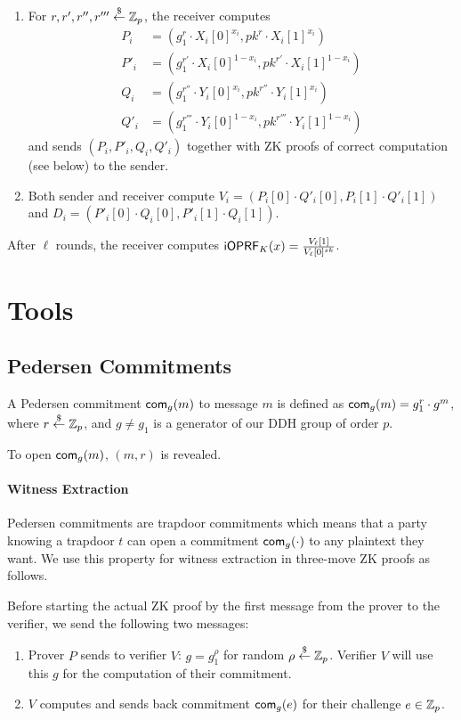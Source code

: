 \documentclass{article}
\begin{document}
\begin{enumerate}
\item
  For $r,r',r'',r'''\stackrel{\$}{\leftarrow}\mathbb{Z}_p$, the receiver computes
  \begin{align*}
    P_i&=(g_1^r\cdot{}X_i[0]^{x_i},pk^r\cdot{}X_i[1]^{x_i})
    \\P'_i&=(g_1^{r'}\cdot{}X_i[0]^{1-x_i},pk^{r'}\cdot{}X_i[1]^{1-x_i})
   \\Q_i&=(g_1^{r''}\cdot{}Y_i[0]^{x_i},pk^{r''}\cdot{}Y_i[1]^{x_i})
   \\Q'_i&=(g_1^{r'''}\cdot{}Y_i[0]^{1-x_i},pk^{r'''}\cdot{}Y_i[1]^{1-x_i})
  \end{align*} 
  and sends $(P_i,P'_i,Q_i,Q'_i)$ together with ZK proofs of correct
  computation (see below) to the sender.
\item Both sender and receiver compute
  $V_i=(P_i[0]\cdot{}Q'_i[0],P_i[1]\cdot{}Q'_i[1])$ and
  $D_i=(P'_i[0]\cdot{}Q_i[0],P'_i[1]\cdot{}Q_i[1])$.
  
\end{enumerate}

After $\ell$ rounds, the receiver computes
$\mathsf{i}\mathsf{OPRF}_K(x)=\frac{V_\ell[1]}{V_{\ell}[0]^{sk}}$.


\section{Tools}
\subsection{Pedersen Commitments}
A Pedersen commitment $\mathsf{com}_{g}(m)$ to message $m$ is defined as
$\mathsf{com}_{g}(m)=g_1^r\cdot{}g^m$, where $r\stackrel{\$}{\leftarrow}\mathbb{Z}_p$, and $g\neq{}g_1$ is
a generator of our DDH group of order $p$.

To open $\mathsf{com}_{g}(m)$, $(m,r)$ is revealed.

\paragraph{Witness Extraction}
Pedersen commitments are trapdoor commitments which means that a party
knowing a trapdoor $t$ can open a commitment $\mathsf{com}_g(\cdot)$ to any
plaintext they want.  We use this property for witness extraction in
three-move ZK proofs as follows.

Before starting the actual ZK proof by the first message from the
prover to the verifier, we send the following two messages:
\begin{enumerate}
\item Prover $P$ sends to verifier $V$: $g=g_1^\rho$ for random
  $\rho\stackrel{\$}{\leftarrow}\mathbb{Z}_p$. Verifier $V$ will use this $g$ for the computation
  of their commitment.
  \item $V$ computes and sends back commitment $\mathsf{com}_g(e)$ for their
    challenge $e\in\mathbb{Z}_p$.
\end{enumerate}
\end{document}
